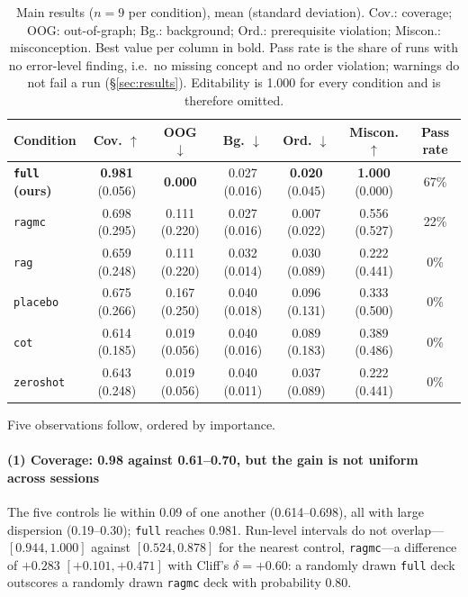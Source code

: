 \documentclass[review,12pt]{elsarticle}
\renewcommand{\_}{\kgunderscore\allowbreak}
\newcommand{\id}[1]{\texttt{#1}}
\begin{document}
\begin{table}[t]
\caption{Main results ($n=9$ per condition), mean (standard deviation). Cov.:
coverage; OOG: out-of-graph; Bg.: background; Ord.: prerequisite violation;
Miscon.: misconception. Best value per column in bold. Pass rate is the share of
runs with no error-level finding, i.e.\ no missing concept and no order
violation; warnings do not fail a run (\S\ref{sec:results}). Editability is 1.000
for every condition and is therefore omitted.}
\label{tab:main}
\scriptsize
\setlength{\tabcolsep}{2.4pt}
\begin{tabularx}{\linewidth}{@{}L{2.55cm}cccccc@{}}
\toprule
Condition & Cov. $\uparrow$ & OOG $\downarrow$ & Bg. $\downarrow$
& Ord. $\downarrow$ & Miscon. $\uparrow$ & Pass rate \\
\midrule
\textbf{\id{full} (ours)} & \textbf{0.981} (0.056) & \textbf{0.000} & 0.027 (0.016)
& \textbf{0.020} (0.045) & \textbf{1.000} (0.000) & 67\% \\
\id{rag\_mc} & 0.698 (0.295) & 0.111 (0.220) & 0.027 (0.016) & 0.007 (0.022)
& 0.556 (0.527) & 22\% \\
\id{rag} & 0.659 (0.248) & 0.111 (0.220) & 0.032 (0.014) & 0.030 (0.089)
& 0.222 (0.441) & 0\% \\
\id{placebo} & 0.675 (0.266) & 0.167 (0.250) & 0.040 (0.018) & 0.096 (0.131)
& 0.333 (0.500) & 0\% \\
\id{cot} & 0.614 (0.185) & 0.019 (0.056) & 0.040 (0.016) & 0.089 (0.183)
& 0.389 (0.486) & 0\% \\
\id{zero\_shot} & 0.643 (0.248) & 0.019 (0.056) & 0.040 (0.011) & 0.037 (0.089)
& 0.222 (0.441) & 0\% \\
\bottomrule
\end{tabularx}
\end{table}

Five observations follow, ordered by importance.

\paragraph{(1) Coverage: 0.98 against 0.61--0.70, but the gain is not uniform
across sessions} The five controls lie within 0.09 of one another
(0.614--0.698), all with large dispersion (0.19--0.30); \id{full} reaches 0.981.
Run-level intervals do not overlap---$[0.944, 1.000]$ against $[0.524, 0.878]$
for the nearest control, \id{rag\_mc}---a difference of $+0.283$
$[+0.101, +0.471]$ with Cliff's $\delta=+0.60$: a randomly drawn \id{full} deck
outscores a randomly drawn \id{rag\_mc} deck with probability 0.80.
\end{document}
